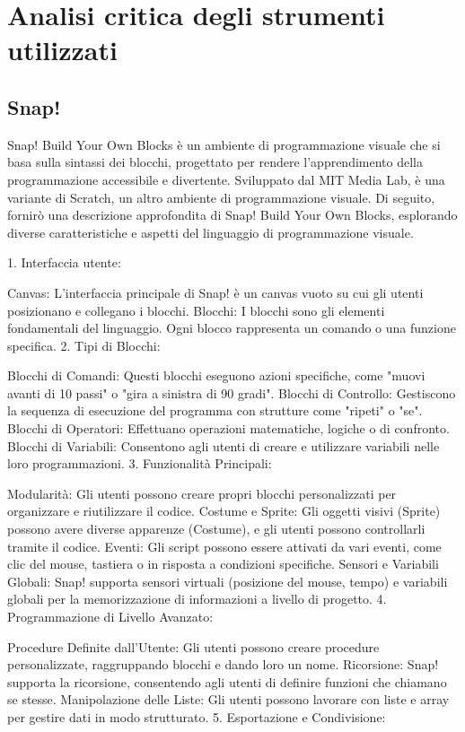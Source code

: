 \chapter{Analisi critica degli strumenti utilizzati}\label{chap:analysis}
\section{Snap!}
Snap! Build Your Own Blocks è un ambiente di programmazione visuale che si basa sulla sintassi dei blocchi, progettato per rendere l'apprendimento della programmazione accessibile e divertente. Sviluppato dal MIT Media Lab, è una variante di Scratch, un altro ambiente di programmazione visuale. Di seguito, fornirò una descrizione approfondita di Snap! Build Your Own Blocks, esplorando diverse caratteristiche e aspetti del linguaggio di programmazione visuale.

1. Interfaccia utente:

Canvas: L'interfaccia principale di Snap! è un canvas vuoto su cui gli utenti posizionano e collegano i blocchi.
Blocchi: I blocchi sono gli elementi fondamentali del linguaggio. Ogni blocco rappresenta un comando o una funzione specifica.
2. Tipi di Blocchi:

Blocchi di Comandi: Questi blocchi eseguono azioni specifiche, come "muovi avanti di 10 passi" o "gira a sinistra di 90 gradi".
Blocchi di Controllo: Gestiscono la sequenza di esecuzione del programma con strutture come "ripeti" o "se".
Blocchi di Operatori: Effettuano operazioni matematiche, logiche o di confronto.
Blocchi di Variabili: Consentono agli utenti di creare e utilizzare variabili nelle loro programmazioni.
3. Funzionalità Principali:

Modularità: Gli utenti possono creare propri blocchi personalizzati per organizzare e riutilizzare il codice.
Costume e Sprite: Gli oggetti visivi (Sprite) possono avere diverse apparenze (Costume), e gli utenti possono controllarli tramite il codice.
Eventi: Gli script possono essere attivati da vari eventi, come clic del mouse, tastiera o in risposta a condizioni specifiche.
Sensori e Variabili Globali: Snap! supporta sensori virtuali (posizione del mouse, tempo) e variabili globali per la memorizzazione di informazioni a livello di progetto.
4. Programmazione di Livello Avanzato:

Procedure Definite dall'Utente: Gli utenti possono creare procedure personalizzate, raggruppando blocchi e dando loro un nome.
Ricorsione: Snap! supporta la ricorsione, consentendo agli utenti di definire funzioni che chiamano se stesse.
Manipolazione delle Liste: Gli utenti possono lavorare con liste e array per gestire dati in modo strutturato.
5. Esportazione e Condivisione:

